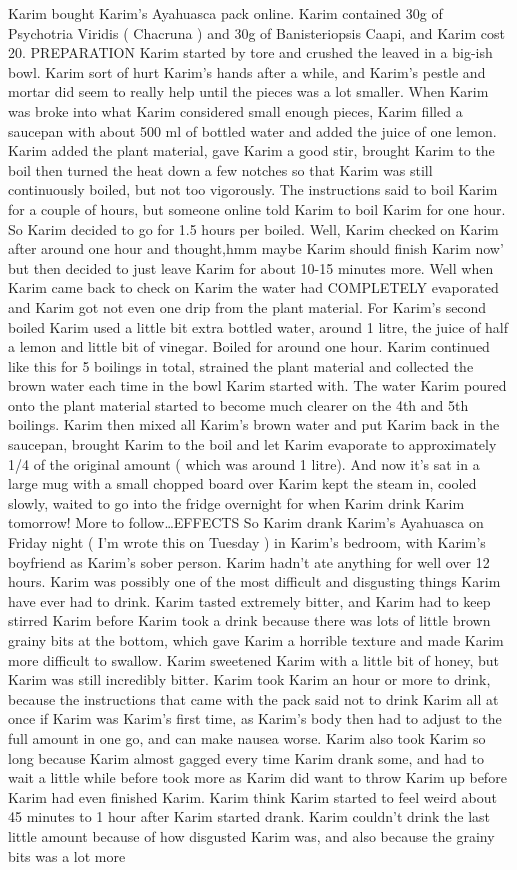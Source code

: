 \documentclass[12pt]{book}
\begin{document}
Karim bought Karim's Ayahuasca pack online. Karim contained 30g of Psychotria Viridis ( Chacruna ) and 30g of Banisteriopsis Caapi, and Karim cost 20. PREPARATION Karim started by tore and crushed the leaved in a big-ish bowl. Karim sort of hurt Karim's hands after a while, and Karim's pestle and mortar did seem to really help until the pieces was a lot smaller. When Karim was broke into what Karim considered small enough pieces, Karim filled a saucepan with about 500 ml of bottled water and added the juice of one lemon. Karim added the plant material, gave Karim a good stir, brought Karim to the boil then turned the heat down a few notches so that Karim was still continuously boiled, but not too vigorously. The instructions said to boil Karim for a couple of hours, but someone online told Karim to boil Karim for one hour. So Karim decided to go for 1.5 hours per boiled. Well, Karim checked on Karim after around one hour and thought,hmm maybe Karim should finish Karim now' but then decided to just leave Karim for about 10-15 minutes more. Well when Karim came back to check on Karim the water had COMPLETELY evaporated and Karim got not even one drip from the plant material. For Karim's second boiled Karim used a little bit extra bottled water, around 1 litre, the juice of half a lemon and little bit of vinegar. Boiled for around one hour. Karim continued like this for 5 boilings in total, strained the plant material and collected the brown water each time in the bowl Karim started with. The water Karim poured onto the plant material started to become much clearer on the 4th and 5th boilings. Karim then mixed all Karim's brown water and put Karim back in the saucepan, brought Karim to the boil and let Karim evaporate to approximately 1/4 of the original amount ( which was around 1 litre). And now it's sat in a large mug with a small chopped board over Karim kept the steam in, cooled slowly, waited to go into the fridge overnight for when Karim drink Karim tomorrow! More to follow\ldots EFFECTS So Karim drank Karim's Ayahuasca on Friday night ( I'm wrote this on Tuesday ) in Karim's bedroom, with Karim's boyfriend as Karim's sober person. Karim hadn't ate anything for well over 12 hours. Karim was possibly one of the most difficult and disgusting things Karim have ever had to drink. Karim tasted extremely bitter, and Karim had to keep stirred Karim before Karim took a drink because there was lots of little brown grainy bits at the bottom, which gave Karim a horrible texture and made Karim more difficult to swallow. Karim sweetened Karim with a little bit of honey, but Karim was still incredibly bitter. Karim took Karim an hour or more to drink, because the instructions that came with the pack said not to drink Karim all at once if Karim was Karim's first time, as Karim's body then had to adjust to the full amount in one go, and can make nausea worse. Karim also took Karim so long because Karim almost gagged every time Karim drank some, and had to wait a little while before took more as Karim did want to throw Karim up before Karim had even finished Karim. Karim think Karim started to feel weird about 45 minutes to 1 hour after Karim started drank. Karim couldn't drink the last little amount because of how disgusted Karim was, and also because the grainy bits was a lot more 
\end{document}
